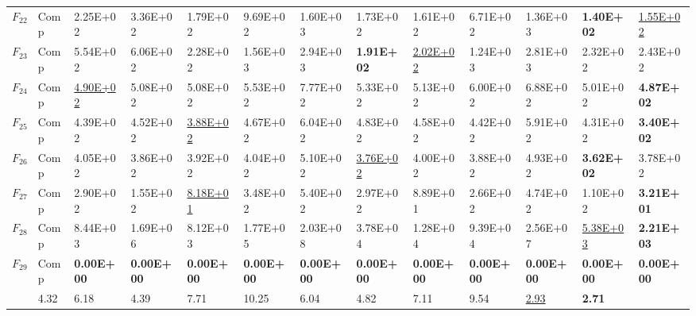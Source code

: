 \begin{table}
\begin{tabular}{cl*{10}{R{1.60cm}}R{1.70cm}}
$F_{22}$ & Comp & 2.25E+02 & 3.36E+02 & 1.79E+02 & 9.69E+02 & 1.60E+03 & 1.73E+02 & 1.61E+02 & 6.71E+02 & 1.36E+03 & \textbf{1.40E+02} & \underline{1.55E+02}\\
$F_{23}$ & Comp & 5.54E+02 & 6.06E+02 & 2.28E+02 & 1.56E+03 & 2.94E+03 & \textbf{1.91E+02} & \underline{2.02E+02} & 1.24E+03 & 2.81E+03 & 2.32E+02 & 2.43E+02\\
$F_{24}$ & Comp & \underline{4.90E+02} & 5.08E+02 & 5.08E+02 & 5.53E+02 & 7.77E+02 & 5.33E+02 & 5.13E+02 & 6.00E+02 & 6.88E+02 & 5.01E+02 & \textbf{4.87E+02}\\
$F_{25}$ & Comp & 4.39E+02 & 4.52E+02 & \underline{3.88E+02} & 4.67E+02 & 6.04E+02 & 4.83E+02 & 4.58E+02 & 4.42E+02 & 5.91E+02 & 4.31E+02 & \textbf{3.40E+02}\\
$F_{26}$ & Comp & 4.05E+02 & 3.86E+02 & 3.92E+02 & 4.04E+02 & 5.10E+02 & \underline{3.76E+02} & 4.00E+02 & 3.88E+02 & 4.93E+02 & \textbf{3.62E+02} & 3.78E+02\\
$F_{27}$ & Comp & 2.90E+02 & 1.55E+02 & \underline{8.18E+01} & 3.48E+02 & 5.40E+02 & 2.97E+02 & 8.89E+01 & 2.66E+02 & 4.74E+02 & 1.10E+02 & \textbf{3.21E+01}\\
$F_{28}$ & Comp & 8.44E+03 & 1.69E+06 & 8.12E+03 & 1.77E+05 & 2.03E+08 & 3.78E+04 & 1.28E+04 & 9.39E+04 & 2.56E+07 & \underline{5.38E+03} & \textbf{2.21E+03}\\
$F_{29}$ & Comp & \textbf{0.00E+00} & \textbf{0.00E+00} & \textbf{0.00E+00} & \textbf{0.00E+00} & \textbf{0.00E+00} & \textbf{0.00E+00} & \textbf{0.00E+00} & \textbf{0.00E+00} & \textbf{0.00E+00} & \textbf{0.00E+00} & \textbf{0.00E+00}\\
\midrule
{} & 4.32 & 6.18 & 4.39 & 7.71 & 10.25 & 6.04 & 4.82 & 7.11 & 9.54 & \underline{2.93} & \textbf{2.71}\\
\bottomrule
\end{tabular}
\end{table}
